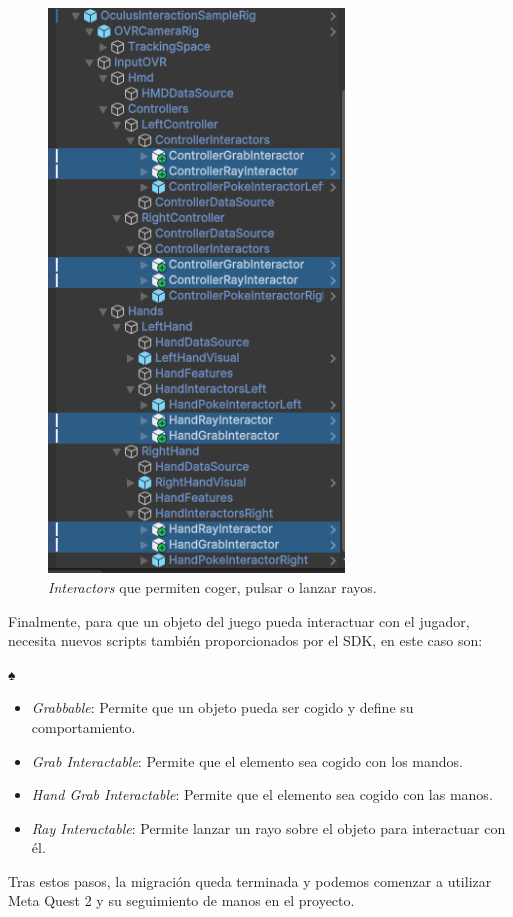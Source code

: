 \begin{figure}
	\centering
	\includegraphics[width=0.7\textwidth]{04.Desarrollo/05.Entrega5/01.Iteracion5_1/00.Figuras/06.interactors.png}
	\caption{\textit{Interactors} que permiten coger, pulsar o lanzar rayos.}
	\label{fig:interactors}
\end{figure}

Finalmente, para que un objeto del juego pueda interactuar con el jugador, necesita nuevos scripts también proporcionados por el SDK, en este caso son: 

♠\begin{itemize}
	\item {\textit{Grabbable}: Permite que un objeto pueda ser cogido y define su comportamiento.}
	\item{\textit{Grab Interactable}: Permite que el elemento sea cogido con los mandos.}
	\item{\textit{Hand Grab Interactable}: Permite que el elemento sea cogido con las manos.}
	\item{\textit{Ray Interactable}: Permite lanzar un rayo sobre el objeto para interactuar con él.}
\end{itemize}


Tras estos pasos, la migración queda terminada y podemos comenzar a utilizar Meta Quest 2 y su seguimiento de manos en el proyecto.













